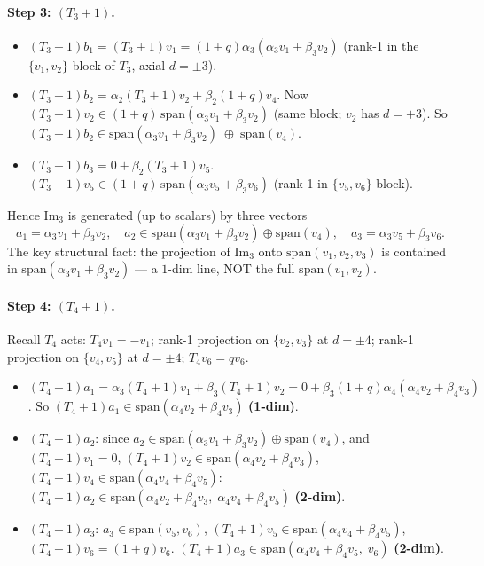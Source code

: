\documentclass[11pt]{article}
\theoremstyle{definition}
\begin{document}
\paragraph{Step 3: $(T_3{+}1)$.}
\begin{itemize}[topsep=0.3em,itemsep=0.2em,leftmargin=2em]
\item $(T_3{+}1) b_1 = (T_3{+}1) v_1 = (1{+}q)\alpha_3
(\alpha_3 v_1 + \beta_3 v_2)$
(rank-1 in the $\{v_1, v_2\}$ block of $T_3$, axial $d=\pm 3$).
\item $(T_3{+}1) b_2 = \alpha_2 (T_3{+}1) v_2 + \beta_2 (1{+}q) v_4$.
Now $(T_3{+}1) v_2 \in (1{+}q)\,\mathrm{span}(\alpha_3 v_1 + \beta_3 v_2)$
(same block; $v_2$ has $d{=}+3$). So
$(T_3{+}1) b_2 \in
\mathrm{span}(\alpha_3 v_1 + \beta_3 v_2)\;\oplus\;\mathrm{span}(v_4)$.
\item $(T_3{+}1) b_3 = 0 + \beta_2 (T_3{+}1) v_5$.
$(T_3{+}1) v_5 \in (1{+}q)\,\mathrm{span}(\alpha_3 v_5 + \beta_3 v_6)$
(rank-1 in $\{v_5, v_6\}$ block).
\end{itemize}
Hence $\mathrm{Im}_3$ is generated (up to scalars) by three vectors
\[
a_1 = \alpha_3 v_1 + \beta_3 v_2,\quad
a_2 \in \mathrm{span}(\alpha_3 v_1 + \beta_3 v_2)\oplus\mathrm{span}(v_4),\quad
a_3 = \alpha_3 v_5 + \beta_3 v_6.
\]
The key structural fact: the projection of $\mathrm{Im}_3$ onto
$\mathrm{span}(v_1, v_2, v_3)$ is contained in
$\mathrm{span}(\alpha_3 v_1 + \beta_3 v_2)$ --- a $1$-dim line, NOT
the full $\mathrm{span}(v_1, v_2)$.

\paragraph{Step 4: $(T_4{+}1)$.}
Recall $T_4$ acts:
$T_4 v_1 = -v_1$;
rank-1 projection on $\{v_2, v_3\}$ at $d=\pm 4$;
rank-1 projection on $\{v_4, v_5\}$ at $d=\pm 4$;
$T_4 v_6 = q v_6$.

\begin{itemize}[topsep=0.3em,itemsep=0.2em,leftmargin=2em]
\item $(T_4{+}1) a_1 = \alpha_3 (T_4{+}1) v_1 + \beta_3 (T_4{+}1) v_2
                      = 0 + \beta_3 (1{+}q)\alpha_4(\alpha_4 v_2 + \beta_4 v_3)$.
So $(T_4{+}1) a_1 \in \mathrm{span}(\alpha_4 v_2 + \beta_4 v_3)$
\quad\textbf{(1-dim)}.
\item $(T_4{+}1) a_2$: since $a_2 \in \mathrm{span}(\alpha_3 v_1
+ \beta_3 v_2)\oplus\mathrm{span}(v_4)$, and $(T_4{+}1) v_1 = 0$,
$(T_4{+}1) v_2 \in \mathrm{span}(\alpha_4 v_2 + \beta_4 v_3)$,
$(T_4{+}1) v_4 \in \mathrm{span}(\alpha_4 v_4 + \beta_4 v_5)$:
$(T_4{+}1) a_2 \in \mathrm{span}(\alpha_4 v_2 + \beta_4 v_3,\;
                                 \alpha_4 v_4 + \beta_4 v_5)$
\quad\textbf{(2-dim)}.
\item $(T_4{+}1) a_3$: $a_3 \in \mathrm{span}(v_5, v_6)$,
$(T_4{+}1) v_5 \in \mathrm{span}(\alpha_4 v_4 + \beta_4 v_5)$,
$(T_4{+}1) v_6 = (1{+}q) v_6$.
$(T_4{+}1) a_3 \in \mathrm{span}(\alpha_4 v_4 + \beta_4 v_5,\;v_6)$
\quad\textbf{(2-dim)}.
\end{itemize}
\end{document}
